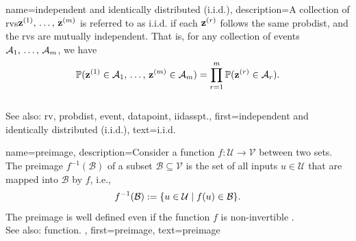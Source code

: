 {name={independent and identically distributed (i.i.d.)}, 
	description={A collection of \glspl{rv}\linebreak ${\bf z}^{(1)}, \,\ldots, \,{\bf z}^{(m)}$ is 
		referred to as i.i.d. 
		if each ${\bf z}^{(r)}$ follows the same \gls{probdist}, and 
		the \glspl{rv} are mutually independent. That is, for any collection of 
		\glspl{event} $\mathcal{A}_1, \,\ldots, \,\mathcal{A}_m$, we have
       		\[
          		\mathbb{P}({ {\bf z}^{(1)} \in \mathcal{A}_1, \,\ldots, \,{\bf z}^{(m)} \in \mathcal{A}_{m}}) 
         		= \prod_{r=1}^{m} \mathbb{P}({ {\bf z}^{(r)} \in \mathcal{A}_r}).
         	\]
				\\
		See also: \gls{rv}, \gls{probdist}, \gls{event}, \gls{datapoint}, \gls{iidasspt}.},
	first={independent and identically distributed (i.i.d.)},
	text={{i.i.d.}} 
}

{name={preimage}, 
	description={Consider a \gls{function} $f\colon \mathcal{U} \rightarrow \mathcal{V}$ 
		between two sets. The preimage $f^{-1}(\mathcal{B})$ of a subset $\mathcal{B} \subseteq \mathcal{V}$ is the set 
		of all inputs $u \in \mathcal{U}$ that are mapped into $\mathcal{B}$ by $f$, i.e.,
		\[
		f^{-1}(\mathcal{B}) := \{ u \in \mathcal{U} \mid f(u) \in \mathcal{B} \}.
		\]
		The preimage is well defined even if the \gls{function} $f$ is non-invertible \cite{RudinBookPrinciplesMatheAnalysis}.
		\\
		See also: \gls{function}. },
	first={preimage},
	text={preimage}
}

